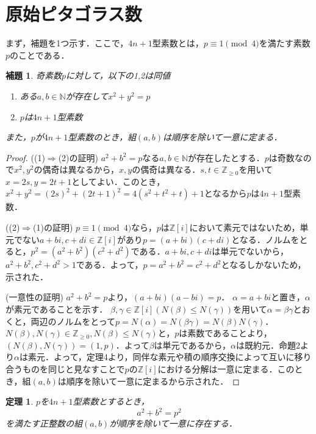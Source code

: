 \documentclass[dvipdfmx]{jsarticle}
\newtheorem*{theorem*}{定理}
\newtheorem*{lemma*}{補題}
\begin{document}
\section{原始ピタゴラス数}

まず，補題を1つ示す．ここで，$4n+1$型素数とは，$p\equiv 1\pmod 4$を満たす素数$p$のことである．

\begin{lemma*}
奇素数$p$に対して，以下の1,2は同値
\begin{enumerate}
 \item ある$a,b\in\mathbb{N}$が存在して$x^2+y^2=p$\\
 \item $p$は$4n+1$型素数
\end{enumerate}
また，$p$が$4n+1$型素数のとき，組$(a,b)$は順序を除いて一意に定まる．
\end{lemma*}

\begin{proof}

((1)$\Longrightarrow$(2)の証明)
$a^2+b^2=p$なる$a,b\in\mathbb{N}$が存在したとする．$p$は奇数なので$x^2,y^2$の偶奇は異なるから，$x,y$の偶奇は異なる．$s,t\in\mathbb{Z}_{\geq0}$を用いて$x=2s,y=2t+1$としてよい．このとき，$x^2+y^2=(2s)^2+(2t+1)^2=4(s^2+t^2+t)+1$となるから$p$は$4n+1$型素数．

((2)$\Longrightarrow$(1)の証明)
$p\equiv1\pmod4$なら，$p$は$\mathbb{Z}[i]$において素元ではないため，単元でない$a+bi,c+di\in\mathbb{Z}[i]$があり$p=(a+bi)(c+di)$となる．ノルムをとると，$p^2=(a^2+b^2)(c^2+d^2)$である．$a+bi,c+di$は単元でないから，$a^2+b^2,c^2+d^2>1$である．よって，$p=a^2+b^2=c^2+d^2$となるしかないため，示された．


(一意性の証明)
$a^2+b^2=p$より，$(a+bi)(a-bi)=p$．
$\alpha=a+bi$と置き，$\alpha$が素元であることを示す．
$\beta,\gamma\in\mathbb{Z}[i](N(\beta)\leq N(\gamma))$を用いて$\alpha=\beta\gamma$とおくと，両辺のノルムをとって$p=N(\alpha)=N(\beta\gamma)=N(\beta)N(\gamma)$．$N(\beta),N(\gamma)\in\mathbb{Z}_{\geq0},N(\beta)\leq N(\gamma)$と，$p$は素数であることより，$(N(\beta),N(\gamma))=(1,p)$．よって$\beta$は単元であるから，$\alpha$は既約元．命題2より$\alpha$は素元．よって，定理4より，同伴な素元や積の順序交換によって互いに移り合うものを同じと見なすことで$p$の$\mathbb{Z}[i]$における分解は一意に定まる．このとき，組$(a,b)$は順序を除いて一意に定まるから示された．
\end{proof}


\begin{theorem*}
$p$を$4n+1$型素数とするとき，
$$a^2+b^2=p^2$$
を満たす正整数の組$(a,b)$が順序を除いて一意に存在する．
\end{theorem*}
\end{document}
